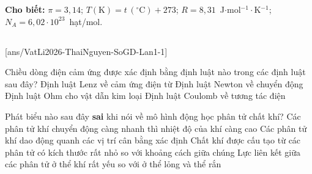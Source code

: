 \def\CheDo{solcolor}%
\def\tenchuong{Sở GD\&ĐT Thái Nguyên -- Lần 1}
\def\thuonghieu{VẬT LÍ 12 -- Eduzy.com.vn}
\def\TachCauDS{1}
\def\TachCauLG{1}




	\noindent\textbf{Cho biết:} $\pi=3{,}14$; $T(\text{K})=t\,(^\circ\text{C})+273$; $R=8{,}31$~J$\cdot$mol$^{-1}\cdot$K$^{-1}$; $N_A=6{,}02\cdot 10^{23}$~hạt/mol.

	\noindent
	\subsection*{}
	\setcounter{ex}{0}
	[ans/VatLi2026-ThaiNguyen-SoGD-Lan1-1]

	\begin{ex}%
		Chiều dòng điện cảm ứng được xác định bằng định luật nào trong các định luật sau đây?
		\choice
		{\True Định luật Lenz về cảm ứng điện từ}
		{Định luật Newton về chuyển động}
		{Định luật Ohm cho vật dẫn kim loại}
		{Định luật Coulomb về tương tác điện}
	\end{ex}

	\begin{ex}%
		Phát biểu nào sau đây \textbf{sai} khi nói về mô hình động học phân tử chất khí?
		\choice
		{Các phân tử khí chuyển động càng nhanh thì nhiệt độ của khí càng cao}
		{\True Các phân tử khí dao động quanh các vị trí cân bằng xác định}
		{Chất khí được cấu tạo từ các phân tử có kích thước rất nhỏ so với khoảng cách giữa chúng}
		{Lực liên kết giữa các phân tử ở thể khí rất yếu so với ở thể lỏng và thể rắn}
	\end{ex}

